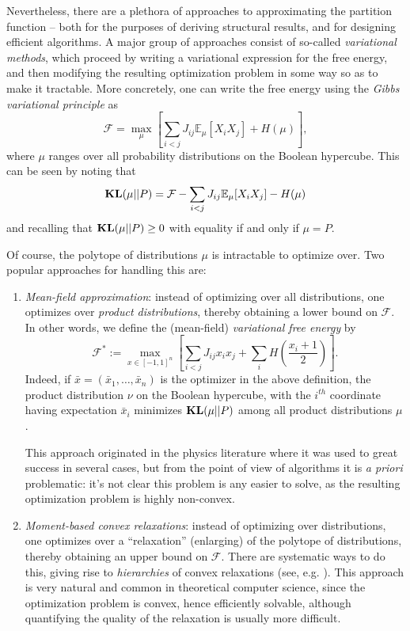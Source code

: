 \documentclass[11pt, oneside, english]{article}
\newcommand{\bE}{\mathbb{E}}
\newcommand{\F}{\mathcal{F}}
\newcommand{\E}{\bE}      %
\newcommand{\KL}{\mathop{\bf KL\/}}
\theoremstyle{definition}
\theoremstyle{plain}
\begin{document}
Nevertheless, there are a plethora of approaches to approximating the partition function -- both for the purposes of deriving structural results, and for designing efficient algorithms. A major group of approaches consist of so-called \emph{variational methods}, which proceed by writing a variational expression for the free energy, and then modifying the resulting optimization problem in some way so as to make it tractable. More concretely, one can write the free energy using the \emph{Gibbs variational principle} as 
\begin{equation}\label{eqn:gibbs}
 \F = \max_{\mu} \left[\sum_{i < j} J_{ij} \E_{\mu}[X_i X_j] + H(\mu)\right], 
\end{equation}
where $\mu$ ranges over all probability distributions on the Boolean hypercube. This can be seen by noting that 
\begin{equation}
\label{eqn:free-energy-KL}
\KL(\mu ||P)=\F - \sum_{i < j} J_{ij} \E_{\mu}[X_i X_j] - H(\mu)
\end{equation}
and recalling that $\KL(\mu ||P) \geq 0$ with equality if and only if $\mu = P$.

Of course, the polytope of distributions $\mu$ is intractable to optimize over. Two popular approaches for handling this are: \\
\begin{enumerate}
\item \emph{Mean-field approximation}: instead of optimizing over all distributions, one optimizes over \emph{product distributions}, thereby obtaining a lower bound on $\F$. In other words, we define the (mean-field) \emph{variational free energy} by
\[ \F^* := \max_{x \in [-1,1]^n} \left[\sum_{i < j} J_{ij}
      x_i x_j + \sum_i H\left(\frac{x_i +
        1}{2}\right)\right]. \] 
Indeed, if $\bar{x} = (\bar{x}_1,\dots,\bar{x}_n)$ is the optimizer in the above definition, the product distribution $\nu$ on the Boolean hypercube, with the $i^{th}$ coordinate having expectation $\bar{x}_i$ minimizes $\KL(\mu||P)$ among all product distributions $\mu$. 

This approach originated in the physics literature where it was used to great success in several cases, but from the point of view of algorithms it is \emph{a priori} problematic: it's not clear this problem is any easier to solve, as 
the resulting optimization problem is highly non-convex. 
  
\item \emph{Moment-based convex relaxations}: instead of optimizing over distributions, one optimizes over a ``relaxation'' (enlarging) of the polytope of distributions, thereby obtaining an upper bound on $\F$. There are systematic ways to do this, giving rise to \emph{hierarchies} of convex relaxations (see, e.g. \cite{barak2011rounding}). This approach is very natural and common in theoretical computer science, since the optimization problem is convex, hence efficiently solvable, although quantifying the quality of the relaxation is usually more difficult.    
\end{enumerate}
\end{document}
